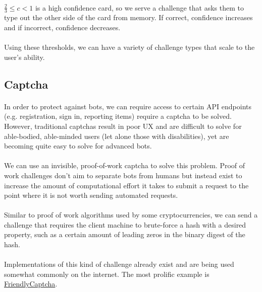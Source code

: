 \documentclass{report}
\begin{document}
\paragraph{}
$\frac{2}{3} \leq c < 1$ is a high confidence card, so we serve a challenge that asks them to type out the other side of the card from memory. If correct, confidence increases and if incorrect, confidence decreases.

\paragraph{}
Using these thresholds, we can have a variety of challenge types that scale to the user's ability.

\subsection{Captcha}
\paragraph{}
In order to protect against bots, we can require access to certain API endpoints (e.g. registration, sign in, reporting items) require a captcha to be solved. However, traditional captchas result in poor UX and are difficult to solve for able-bodied, able-minded users (let alone those with disabilities), yet are becoming quite easy to solve for advanced bots.

\paragraph{}
We can use an invisible, proof-of-work captcha to solve this problem. Proof of work challenges don't aim to separate bots from humans but instead exist to increase the amount of computational effort it takes to submit a request to the point where it is not worth sending automated requests.

\paragraph{}
Similar to proof of work algorithms used by some cryptocurrencies, we can send a challenge that requires the client machine to brute-force a hash with a desired property, such as a certain amount of leading zeros in the binary digest of the hash.

\paragraph{}
Implementations of this kind of challenge already exist and are being used somewhat commonly on the internet. The most prolific example is \href{https://friendlycaptcha.com/}{FriendlyCaptcha}.
\end{document}
